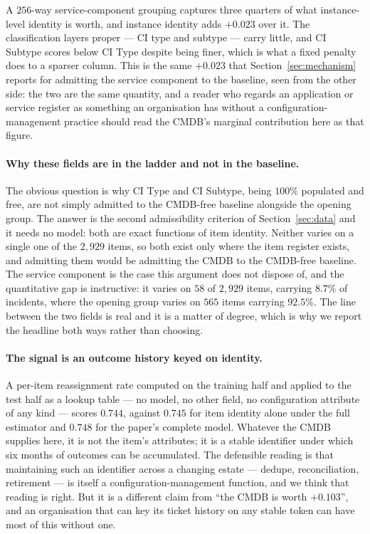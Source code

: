 \documentclass[preprint,12pt]{elsarticle}
\begin{document}
A $256$-way service-component grouping captures three quarters of what
instance-level identity is worth, and instance identity adds $+0.023$ over
it. The classification layers proper --- CI type and subtype --- carry
little, and CI Subtype scores below CI Type despite being finer, which is
what a fixed penalty does to a sparser column. This is the same $+0.023$ that
Section~\ref{sec:mechanism} reports for admitting the service component to
the baseline, seen from the other side: the two are the same quantity, and a
reader who regards an application or service register as something an
organisation has without a configuration-management practice should read the
CMDB's marginal contribution here as that figure.

\paragraph{Why these fields are in the ladder and not in the baseline.}
The obvious question is why CI Type and CI Subtype, being $100\%$ populated
and free, are not simply admitted to the CMDB-free baseline alongside the
opening group. The answer is the second admissibility criterion of
Section~\ref{sec:data} and it needs no model: both are exact functions of
item identity. Neither varies on a single one of the $2{,}929$ items, so both
exist only where the item register exists, and admitting them would be
admitting the CMDB to the CMDB-free baseline. The service component is the
case this argument does not dispose of, and the quantitative gap is
instructive: it varies on $58$ of $2{,}929$ items, carrying $8.7\%$ of
incidents, where the opening group varies on $565$ items carrying $92.5\%$.
The line between the two fields is real and it is a matter of degree, which is
why we report the headline both ways rather than choosing.

\paragraph{The signal is an outcome history keyed on identity.}
A per-item reassignment rate computed on the training half and applied to the
test half as a lookup table --- no model, no other field, no configuration
attribute of any kind --- scores $0.744$, against $0.745$ for item identity
alone under the full estimator and $0.748$ for the paper's complete model. Whatever the CMDB
supplies here, it is not the item's attributes; it is a stable identifier
under which six months of outcomes can be accumulated. The defensible reading
is that maintaining such an identifier across a changing estate --- dedupe,
reconciliation, retirement --- is itself a configuration-management function,
and we think that reading is right. But it is a different claim from ``the
CMDB is worth $+0.103$'', and an organisation that can key its ticket history
on any stable token can have most of this without one.
\end{document}
